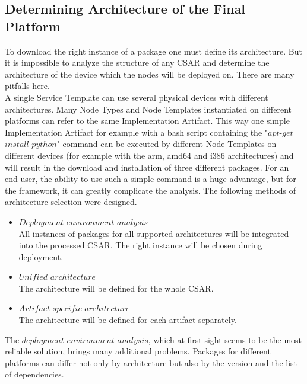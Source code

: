 \subsection{Determining Architecture of the Final Platform} \label{finplatf}
To download the right instance of a package one must define its architecture.
But it is impossible to analyze the structure of any CSAR and determine the architecture of the device which the nodes will be deployed on.
There are many pitfalls here.\\
A single Service Template can use several physical devices with different architectures.
Many Node Types and Node Templates instantiated on different platforms can refer to the same Implementation Artifact.
This way one simple Implementation Artifact for example with a bash script containing the "$apt$-$get$ $install$ $python$" command can be executed by different Node Templates on different devices (for example with the arm, amd64 and i386 architectures) and will result in the download and installation of three different packages. 
For an end user, the ability to use such a simple command is a huge advantage, but for the framework, it can greatly complicate the analysis.
The following methods of architecture selection were designed.
\begin{itemize}
	\item $Deployment$ $environment$ $analysis$\\
	All  instances of packages for all supported architectures will be integrated into the processed CSAR. 
	The right instance will be chosen during deployment.
	\item $Unified$ $architecture$\\
	The architecture will be defined for the whole CSAR.
	\item $Artifact$ $specific$ $architecture$\\
	The architecture will be defined for each artifact separately.
\end{itemize}
The $deployment$ $environment$ $analysis$, which at first sight seems to be the most reliable solution, brings many additional problems.
Packages for different platforms can differ not only by architecture but also by the version and the list of dependencies.
